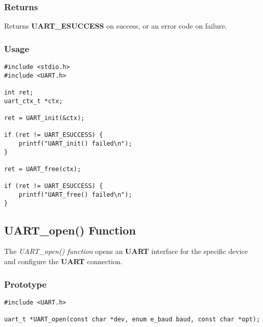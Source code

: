 \documentclass{report}
\begin{document}
\subsubsection*{Returns}
Returns \textbf{UART\_ESUCCESS} on success, or an error code on failure.
\subsubsection*{Usage}
\begin{lstlisting}
#include <stdio.h>
#include <UART.h>

int ret;
uart_ctx_t *ctx;

ret = UART_init(&ctx);

if (ret != UART_ESUCCESS) {
    printf("UART_init() failed\n");
}

ret = UART_free(ctx);

if (ret != UART_ESUCCESS) {
    printf("UART_free() failed\n");
}
\end{lstlisting}
\subsection{UART\_open() Function}
The \textit{UART\_open() function} opens an \textbf{UART} interface for
the specific device and configure the \textbf{UART} connection.
\subsubsection*{Prototype}
\begin{lstlisting}
#include <UART.h>

uart_t *UART_open(const char *dev, enum e_baud baud, const char *opt);
\end{lstlisting}
\end{document}
